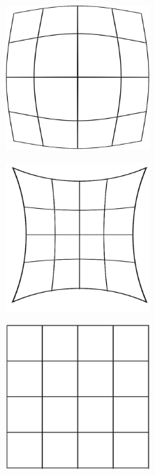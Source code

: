 \begin{figure}[ht!]
	\begin{subfigure}[c]{0.3\textwidth}
		\centering
		\includegraphics[width=0.6\textwidth]{img/camera/distortion-barrel.png}
		\caption{}
		\label{fig:barrel-distortion}
	\end{subfigure}
	\begin{subfigure}[c]{0.3\textwidth}
		\centering
		\includegraphics[width=0.6\textwidth]{img/camera/distortion-pincushion.png}
		\caption{}
		\label{fig:pincushion-distortion}
	\end{subfigure}
	\centering
	\begin{subfigure}[c]{0.3\textwidth}
		\centering
		\includegraphics[width=0.6\textwidth]{img/camera/no-distortion.png}
		\caption{}
		\label{fig:no-distortion-lens}
	\end{subfigure}


\end{figure}

